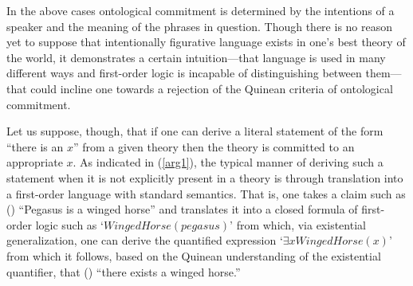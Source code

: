 In the above cases ontological commitment 
is determined by the intentions of a speaker and the meaning of the
phrases in question.   
Though there is no reason yet to suppose that
intentionally figurative language exists in one's best theory of the
world, it demonstrates a certain intuition---that language is used
in many different ways and first-order logic is incapable of
distinguishing between them---that could incline one towards a
rejection of the Quinean criteria of ontological commitment.

Let us suppose, though, that if one can derive a literal statement of
the form
``there is an $x$'' from a given theory then the theory is committed to an appropriate $x$.
As indicated in (\ref{arg1}), the
typical manner of deriving such a statement when it is not explicitly
present in a theory is through translation into a first-order language
with standard semantics.  That is, one takes a claim such as (\cex)
``Pegasus is a winged horse''\label{cex:pegasus} and translates it into a closed formula
of first-order logic such as `$WingedHorse(pegasus)$' from which, via
existential generalization, one can derive the quantified expression
`$\exists xWingedHorse(x)$' from which it follows, based on the
Quinean understanding of the existential quantifier, that (\cex) ``there
exists a winged horse.''\label{cex:winghorse}

